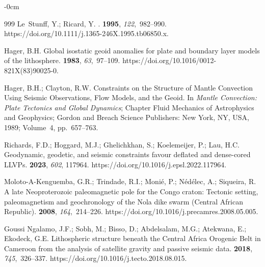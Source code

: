 \documentclass[minerals,article,accept,pdftex,moreauthors]{Definitions/mdpi}
\begin{document}
\begin{adjustwidth}{-\extralength}{0cm}
\begin{thebibliography}{999}
Le~Stunff, Y.; Ricard, Y.
.
 {\bf 1995}, {\em
  122},~982--990.
\newblock https://doi.org/10.1111/j.1365-246X.1995.tb06850.x.

Hager, B.H.
\newblock Global isostatic geoid anomalies for plate and boundary layer models
  of the lithosphere.
 {\bf 1983}, {\em
  63},~97--109.
\newblock https://doi.org/10.1016/0012-821X(83)90025-0.

Hager, B.H.; Clayton, R.W. {Constraints on the Structure of Mantle Convection
  Using Seismic Observations, Flow Models, and the Geoid}.
\newblock In {\em {Mantle Convection: Plate Tectonics and Global Dynamics}}; {Chapter Fluid Mechanics of Astrophysics and Geophysics}; 
  Gordon and Breach Science Publishers: New York, NY, USA,  1989; Volume~4, pp.~657--763.

Richards, F.D.; Hoggard, M.J.; Ghelichkhan, S.; Koelemeijer, P.; Lau, H.C.
\newblock Geodynamic, geodetic, and seismic constraints favour deflated and
  dense-cored LLVPs.
 {\bf 2023}, {\em
  602}, 117964.
\newblock https://doi.org/10.1016/j.epsl.2022.117964.


Moloto-A-Kenguemba, G.R.; Trindade, R.I.; Monié, P.; Nédélec, A.; Siqueira,
  R.
\newblock A late Neoproterozoic paleomagnetic pole for the Congo craton:
  Tectonic setting, paleomagnetism and geochronology of the Nola dike swarm
  (Central African Republic).
 {\bf 2008}, {\em 164},~214--226.
\newblock https://doi.org/10.1016/j.precamres.2008.05.005.

{Goussi Ngalamo}, J.F.; Sobh, M.; Bisso, D.; Abdelsalam, M.G.; Atekwana, E.;
  Ekodeck, G.E.
\newblock Lithospheric structure beneath the Central Africa Orogenic Belt in
  Cameroon from the analysis of satellite gravity and passive seismic data.
 {\bf 2018}, {\em 745},~326--337.
\newblock https://doi.org/10.1016/j.tecto.2018.08.015.


\end{thebibliography}
\end{adjustwidth}
\end{document}
